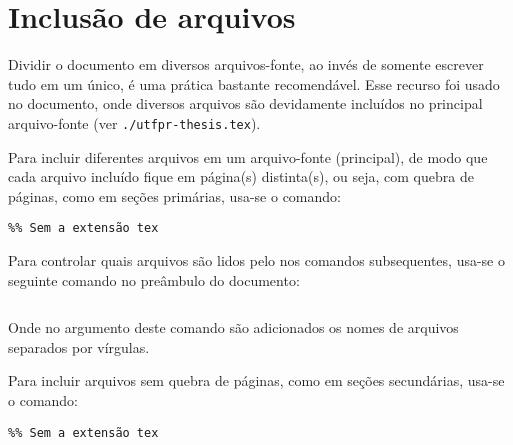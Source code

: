 \section{Inclusão de arquivos}%
\label{sect:files-incl}

Dividir o documento em diversos arquivos-fonte, ao invés de somente escrever tudo em um único, é uma prática bastante recomendável.
Esse recurso foi usado no documento, onde diversos arquivos são devidamente incluídos no principal arquivo-fonte (ver \texttt{./utfpr-thesis.tex}).

Para incluir diferentes arquivos em um arquivo-fonte (principal), de modo que cada arquivo incluído fique em página{(s)} distinta{(s)}, ou seja, com quebra de páginas, como em seções primárias, usa-se o comando:

\begin{snugshade}
\begin{Verbatim}
%% Sem a extensão tex
\end{Verbatim}
\end{snugshade}

Para controlar quais arquivos são lidos pelo  nos comandos  subsequentes, usa-se o seguinte comando no preâmbulo do documento:

\begin{snugshade}
\begin{Verbatim}

\end{Verbatim}
\end{snugshade}

\noindent Onde no argumento deste comando são adicionados os nomes de arquivos separados por vírgulas.

Para incluir arquivos sem quebra de páginas, como em seções secundárias, usa-se o comando:

\begin{snugshade}
\begin{Verbatim}
%% Sem a extensão tex
\end{Verbatim}
\end{snugshade}
